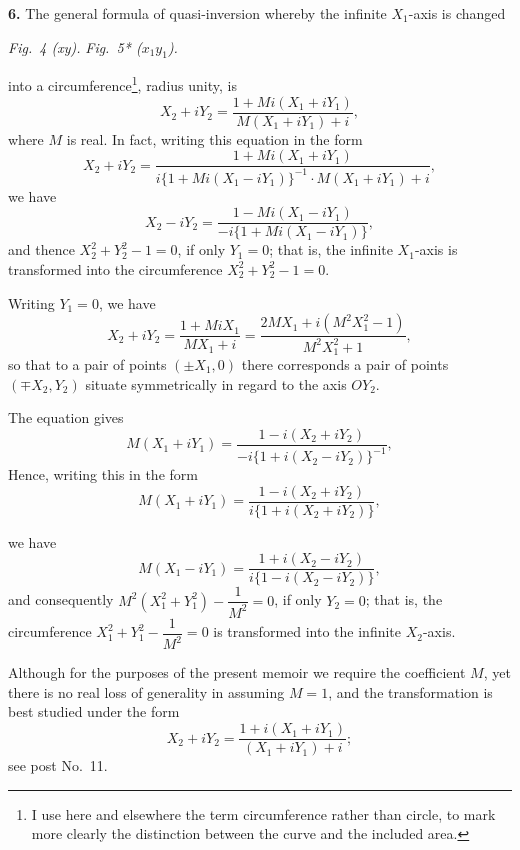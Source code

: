 \documentclass[11pt,a4paper]{article}
\begin{document}
\textbf{6.} The general formula of quasi-inversion whereby the infinite $X_1$-axis is changed
\begin{center}\textit{Fig.\ 4 (xy).} \qquad \textit{Fig.\ 5* (}$x_1 y_1$\textit{).}\end{center}
into a circumference\footnote{I use here and elsewhere the term circumference rather than circle, to mark more clearly the distinction between the curve and the included area.}, radius unity, is
\[
X_2 + i Y_2 = \frac{1 + Mi(X_1 + i Y_1)}{M(X_1 + i Y_1) + i},
\]
where $M$ is real. In fact, writing this equation in the form
\[
X_2 + i Y_2 = \frac{1 + Mi(X_1 + i Y_1)}{i\{1 + Mi(X_1 - i Y_1)\}^{-1}\cdot M(X_1 + i Y_1) + i},
\]
we have
\[
X_2 - i Y_2 = \frac{1 - Mi(X_1 - i Y_1)}{-i\{1 + Mi(X_1 - i Y_1)\}},
\]
and thence $X_2^2 + Y_2^2 - 1 = 0$, if only $Y_1 = 0$; that is, the infinite $X_1$-axis is transformed into the circumference $X_2^2 + Y_2^2 - 1 = 0$.

Writing $Y_1 = 0$, we have
\[
X_2 + i Y_2 = \frac{1 + Mi X_1}{M X_1 + i} = \frac{2 M X_1 + i(M^2 X_1^2 - 1)}{M^2 X_1^2 + 1},
\]
so that to a pair of points $(\pm X_1, 0)$ there corresponds a pair of points $(\mp X_2, Y_2)$ situate symmetrically in regard to the axis $OY_2$.

The equation gives
\[
M(X_1 + i Y_1) = \frac{1 - i(X_2 + i Y_2)}{-i\{1 + i(X_2 - i Y_2)\}^{-1}},
\]
Hence, writing this in the form
\[
M(X_1 + i Y_1) = \frac{1 - i(X_2 + i Y_2)}{i\{1 + i(X_2 + i Y_2)\}},
\]

we have
\[
M(X_1 - i Y_1) = \frac{1 + i(X_2 - i Y_2)}{i\{1 - i(X_2 - i Y_2)\}},
\]
and consequently $M^2(X_1^2 + Y_1^2) - \dfrac{1}{M^2} = 0$, if only $Y_2 = 0$; that is, the circumference $X_1^2 + Y_1^2 - \dfrac{1}{M^2} = 0$ is transformed into the infinite $X_2$-axis.

Although for the purposes of the present memoir we require the coefficient $M$, yet there is no real loss of generality in assuming $M = 1$, and the transformation is best studied under the form
\[
X_2 + i Y_2 = \frac{1 + i(X_1 + i Y_1)}{(X_1 + i Y_1) + i};
\]
see post No.~11.
\end{document}
